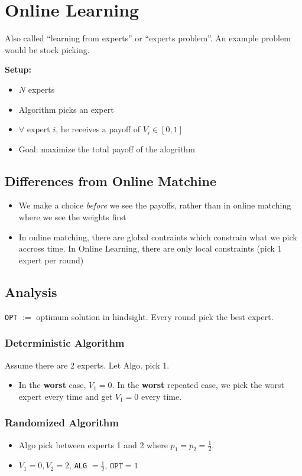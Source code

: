 \section{Online Learning}
Also called ``learning from experts'' or ``experts problem''. 
An example problem would be stock picking.

\textbf{Setup:}
\begin{itemize}
\item $N$ experts
\item Algorithm picks an expert
\item $\forall$ expert $i$, he receives a payoff of $V_{i} \in [0,1]$
\item Goal: maximize the total payoff of the alogrithm
\end{itemize}

\subsection{Differences from Online Matchine}
\label{sec:diff-from-online}

\begin{itemize}
\item We make a choice \textit{before} we see the payoffs, rather than in online matching where we see the weights first
\item In online matching, there are global contraints which constrain what we pick accross time. In Online Learning, there are only local constraints (pick 1 expert per round)
\end{itemize}

\subsection{Analysis}
\texttt{OPT} $:=$ optimum solution in hindsight. Every round pick the best expert.

\subsubsection{Deterministic Algorithm}
\label{sec:determ-algor}
Assume there are 2 experts.
Let Algo. pick 1.
\begin{itemize}
\item In the \textbf{worst} case, $V_{1} = 0$. 
In the \textbf{worst} repeated case, we pick the worst expert every time and get $V_{1} = 0$ every time.
\end{itemize}


\subsubsection{Randomized Algorithm}
\label{sec:randomized-algorithm}
\begin{itemize}
\item Algo pick between experts 1 and 2 where $p_{1} = p_{2} = \frac{1}{2}$.
\item $V_{1}= 0, V_{2} = 2$, \texttt{ALG} $ = \frac{1}{2}$, $\mathtt{OPT} = 1$
\end{itemize}

